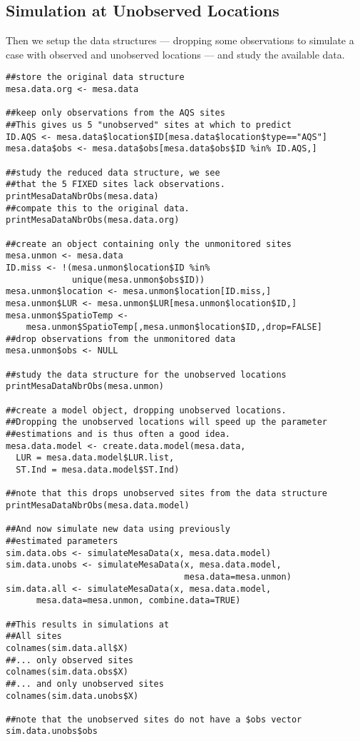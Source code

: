 \subsection{Simulation at Unobserved Locations}
Then we setup the data structures --- dropping some observations to simulate 
a case with observed and unobserved locations --- and study the 
available data.
\vspace*{-0.5\baselineskip}
\begin{verbatim}
##store the original data structure
mesa.data.org <- mesa.data

##keep only observations from the AQS sites
##This gives us 5 "unobserved" sites at which to predict
ID.AQS <- mesa.data$location$ID[mesa.data$location$type=="AQS"]
mesa.data$obs <- mesa.data$obs[mesa.data$obs$ID %in% ID.AQS,]

##study the reduced data structure, we see 
##that the 5 FIXED sites lack observations.
printMesaDataNbrObs(mesa.data)
##compate this to the original data.
printMesaDataNbrObs(mesa.data.org)

##create an object containing only the unmonitored sites
mesa.unmon <- mesa.data
ID.miss <- !(mesa.unmon$location$ID %in% 
             unique(mesa.unmon$obs$ID))
mesa.unmon$location <- mesa.unmon$location[ID.miss,]
mesa.unmon$LUR <- mesa.unmon$LUR[mesa.unmon$location$ID,]
mesa.unmon$SpatioTemp <- 
    mesa.unmon$SpatioTemp[,mesa.unmon$location$ID,,drop=FALSE]
##drop observations from the unmonitored data
mesa.unmon$obs <- NULL

##study the data structure for the unobserved locations
printMesaDataNbrObs(mesa.unmon)

##create a model object, dropping unobserved locations.
##Dropping the unobserved locations will speed up the parameter 
##estimations and is thus often a good idea.
mesa.data.model <- create.data.model(mesa.data,
  LUR = mesa.data.model$LUR.list, 
  ST.Ind = mesa.data.model$ST.Ind)

##note that this drops unobserved sites from the data structure
printMesaDataNbrObs(mesa.data.model)

##And now simulate new data using previously 
##estimated parameters
sim.data.obs <- simulateMesaData(x, mesa.data.model)
sim.data.unobs <- simulateMesaData(x, mesa.data.model, 
                                   mesa.data=mesa.unmon)
sim.data.all <- simulateMesaData(x, mesa.data.model, 
      mesa.data=mesa.unmon, combine.data=TRUE)

##This results in simulations at
##All sites
colnames(sim.data.all$X)
##... only observed sites
colnames(sim.data.obs$X)
##... and only unobserved sites
colnames(sim.data.unobs$X)

##note that the unobserved sites do not have a $obs vector
sim.data.unobs$obs
\end{verbatim}